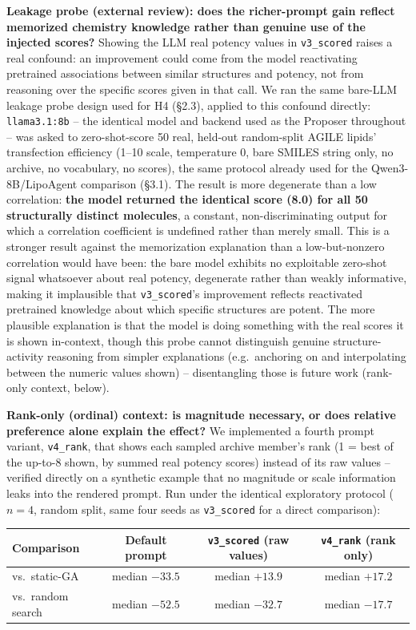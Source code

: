 \documentclass{article}
\begin{document}
\textbf{Leakage probe (external review): does the richer-prompt gain reflect memorized chemistry knowledge rather than genuine use of the injected scores?} Showing the LLM real potency values in \texttt{v3\_scored} raises a real confound: an improvement could come from the model reactivating pretrained associations between similar structures and potency, not from reasoning over the specific scores given in that call. We ran the same bare-LLM leakage probe design used for H4 (\S2.3), applied to this confound directly: \texttt{llama3.1:8b} -- the identical model and backend used as the Proposer throughout -- was asked to zero-shot-score 50 real, held-out random-split AGILE lipids' transfection efficiency (1--10 scale, temperature 0, bare SMILES string only, no archive, no vocabulary, no scores), the same protocol already used for the Qwen3-8B/LipoAgent comparison (\S3.1). The result is more degenerate than a low correlation: \textbf{the model returned the identical score (8.0) for all 50 structurally distinct molecules}, a constant, non-discriminating output for which a correlation coefficient is undefined rather than merely small. This is a stronger result against the memorization explanation than a low-but-nonzero correlation would have been: the bare model exhibits no exploitable zero-shot signal whatsoever about real potency, degenerate rather than weakly informative, making it implausible that \texttt{v3\_scored}'s improvement reflects reactivated pretrained knowledge about which specific structures are potent. The more plausible explanation is that the model is doing something with the real scores it is shown in-context, though this probe cannot distinguish genuine structure-activity reasoning from simpler explanations (e.g.\ anchoring on and interpolating between the numeric values shown) -- disentangling those is future work (rank-only context, below).

\textbf{Rank-only (ordinal) context: is magnitude necessary, or does relative preference alone explain the effect?} We implemented a fourth prompt variant, \texttt{v4\_rank}, that shows each sampled archive member's rank (1 = best of the up-to-8 shown, by summed real potency scores) instead of its raw values -- verified directly on a synthetic example that no magnitude or scale information leaks into the rendered prompt. Run under the identical exploratory protocol ($n=4$, random split, same four seeds as \texttt{v3\_scored} for a direct comparison):

\begin{center}
\begin{tabular}{lccc}
\toprule
Comparison & Default prompt & \texttt{v3\_scored} (raw values) & \texttt{v4\_rank} (rank only) \\
\midrule
vs.\ static-GA & median $-33.5$ & median $+13.9$ & median $\mathbf{+17.2}$ \\
vs.\ random search & median $-52.5$ & median $-32.7$ & median $\mathbf{-17.7}$ \\
\bottomrule
\end{tabular}
\end{center}
\end{document}
